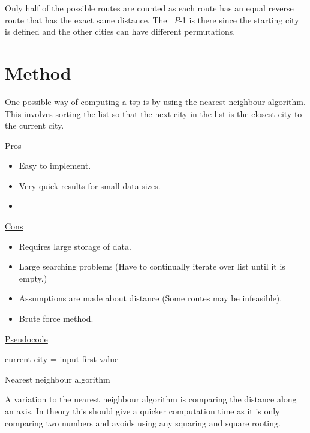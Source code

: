 \documentclass[conference,backref=page]{acmsiggraph}
\begin{document}
Only half of the possible routes are counted as each route has an equal reverse route that has the exact same distance. The ~$P$-1 is there since the starting city is defined and the other cities can have different permutations.

\section{Method}
One possible way of computing a tsp is by using the nearest neighbour algorithm. This involves sorting the list so that the next city in the list is the closest city to the current city. 

\underline{Pros}
\begin{itemize}
	\item Easy to implement.
	\item Very quick results for small data sizes.
	\item 
	
\end{itemize}

\underline{Cons}
\begin{itemize}
	\item Requires large storage of data. 
	\item Large searching problems (Have to continually iterate over list until it is empty.)
	\item Assumptions are made about distance (Some routes may be infeasible).
	\item Brute force method.
\end{itemize}

\underline{Pseudocode}


\begin{algorithm}
	current city = input first value\
\caption{Nearest neighbour algorithm}
\end{algorithm}



A variation to the nearest neighbour algorithm is comparing the distance along an axis. In theory this should give a quicker computation time as it is only comparing two numbers and avoids using any squaring and square rooting.
\end{document}
